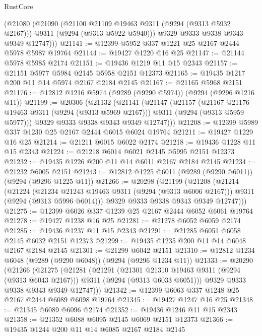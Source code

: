 \begin{lexlean}{RustCore}
\begin{coremodule}
        (@21080
          (@21090
            (@21100 @21109 @19463 @9311 (@9294 (@9313 @5932 @2167)))
            @9311
            (@9294 (@9313 @5922 @5940)))
          @9329
          @9333
          @9338
          @9343
          @9349
          @12747)))
@21141 := @12399 @5952 @337 @1221 @25 @2167 @2444 @5978 @5987 @19764
@21144 := @19427 @1220 @16 @25
@21147 := @21144 @5978 @5985 @2174
@21151 := @19436 @1219 @11 @15 @2343
@21157 := @21151 @5977 @5984 @2145 @5958 @2151 @12373
@21165 := @19435 @1217 @200 @11 @14 @5974 @2167 @2184 @2145
@21167 := @21165 @5968 @2151
@21176 := @12812 @1216 @5974 (@9289 (@9290 @5974)) (@9294 (@9296 @1216 @11))
@21199 := @20306
    (@21132
      (@21141
        (@21147
          (@21157
            (@21167 @21176 @19463 @9311 (@9294 (@9313 @5969 @2167)))
            @9311
            (@9294 (@9313 @5959 @5977)))
          @9329
          @9333
          @9338
          @9343
          @9349
          @12747)))
@21208 := @12399 @5989 @337 @1230 @25 @2167 @2444 @6015 @6024 @19764
@21211 := @19427 @1229 @16 @25
@21214 := @21211 @6015 @6022 @2174
@21218 := @19436 @1228 @11 @15 @2343
@21224 := @21218 @6014 @6021 @2145 @5995 @2151 @12373
@21232 := @19435 @1226 @200 @11 @14 @6011 @2167 @2184 @2145
@21234 := @21232 @6005 @2151
@21243 := @12812 @1225 @6011 (@9289 (@9290 @6011)) (@9294 (@9296 @1225 @11))
@21266 := @20298
    (@21199
      (@21208
        (@21214
          (@21224
            (@21234 @21243 @19463 @9311 (@9294 (@9313 @6006 @2167)))
            @9311
            (@9294 (@9313 @5996 @6014)))
          @9329
          @9333
          @9338
          @9343
          @9349
          @12747)))
@21275 := @12399 @6026 @337 @1239 @25 @2167 @2444 @6052 @6061 @19764
@21278 := @19427 @1238 @16 @25
@21281 := @21278 @6052 @6059 @2174
@21285 := @19436 @1237 @11 @15 @2343
@21291 := @21285 @6051 @6058 @2145 @6032 @2151 @12373
@21299 := @19435 @1235 @200 @11 @14 @6048 @2167 @2184 @2145
@21301 := @21299 @6042 @2151
@21310 := @12812 @1234 @6048 (@9289 (@9290 @6048)) (@9294 (@9296 @1234 @11))
@21333 := @20290
    (@21266
      (@21275
        (@21281
          (@21291
            (@21301 @21310 @19463 @9311 (@9294 (@9313 @6043 @2167)))
            @9311
            (@9294 (@9313 @6033 @6051)))
          @9329
          @9333
          @9338
          @9343
          @9349
          @12747)))
@21342 := @12399 @6063 @337 @1248 @25 @2167 @2444 @6089 @6098 @19764
@21345 := @19427 @1247 @16 @25
@21348 := @21345 @6089 @6096 @2174
@21352 := @19436 @1246 @11 @15 @2343
@21358 := @21352 @6088 @6095 @2145 @6069 @2151 @12373
@21366 := @19435 @1244 @200 @11 @14 @6085 @2167 @2184 @2145

\end{coremodule}
\end{lexlean}
